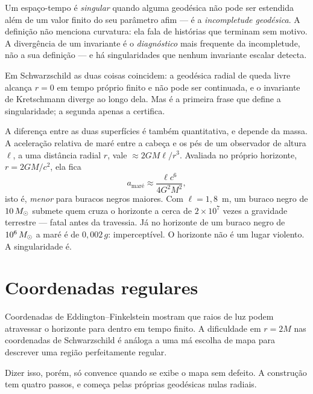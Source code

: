 \documentclass[12pt,a4paper,oneside]{book}
\theoremstyle{rgplain}
\theoremstyle{rgremark}
\begin{document}
\begin{central}
Um espaço-tempo é \emph{singular} quando alguma geodésica não pode ser estendida
além de um valor finito do seu parâmetro afim --- é a \emph{incompletude
geodésica}. A definição não menciona curvatura: ela fala de histórias que
terminam sem motivo. A divergência de um invariante é o \emph{diagnóstico} mais
frequente da incompletude, não a sua definição --- e há singularidades que
nenhum invariante escalar detecta.
\end{central}

Em Schwarzschild as duas coisas coincidem: a geodésica radial de queda livre
alcança $r=0$ em tempo próprio finito e não pode ser continuada, e o invariante
de Kretschmann diverge ao longo dela. Mas é a primeira frase que define a
singularidade; a segunda apenas a certifica.

A diferença entre as duas superfícies é também quantitativa, e depende da massa.
A aceleração relativa de maré entre a cabeça e os pés de um observador de altura
$\ell$, a uma distância radial $r$, vale $\approx2GM\ell/r^3$. Avaliada no
próprio horizonte, $r=2GM/c^2$, ela fica
\[
  a_{\text{maré}}\approx\frac{\ell c^6}{4G^2M^2},
\]
isto é, \emph{menor} para buracos negros maiores. Com $\ell=1{,}8$~m, um buraco
negro de $10\,M_\odot$ submete quem cruza o horizonte a cerca de $2\times10^7$
vezes a gravidade terrestre --- fatal antes da travessia. Já no horizonte de um
buraco negro de $10^6\,M_\odot$ a maré é de $0{,}002\,g$: imperceptível. O
horizonte não é um lugar violento. A singularidade é.

\section{Coordenadas regulares}
\label{sec:coord-regulares}

Coordenadas de Eddington--Finkelstein mostram que raios de luz podem atravessar
o horizonte para dentro em tempo finito. A dificuldade em $r=2M$ nas
coordenadas de Schwarzschild é análoga a uma má escolha de mapa para descrever
uma região perfeitamente regular.

Dizer isso, porém, só convence quando se exibe o mapa sem defeito. A construção
tem quatro passos, e começa pelas próprias geodésicas nulas radiais.
\end{document}
